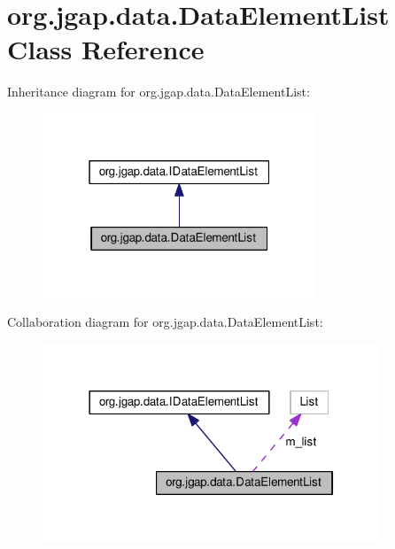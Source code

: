 \hypertarget{classorg_1_1jgap_1_1data_1_1_data_element_list}{\section{org.\-jgap.\-data.\-Data\-Element\-List Class Reference}
\label{classorg_1_1jgap_1_1data_1_1_data_element_list}
}


Inheritance diagram for org.\-jgap.\-data.\-Data\-Element\-List\-:
\nopagebreak
\begin{figure}[H]
\begin{center}
\leavevmode
\includegraphics[width=232pt]{classorg_1_1jgap_1_1data_1_1_data_element_list__inherit__graph}
\end{center}
\end{figure}


Collaboration diagram for org.\-jgap.\-data.\-Data\-Element\-List\-:
\nopagebreak
\begin{figure}[H]
\begin{center}
\leavevmode
\includegraphics[width=285pt]{classorg_1_1jgap_1_1data_1_1_data_element_list__coll__graph}
\end{center}
\end{figure}
